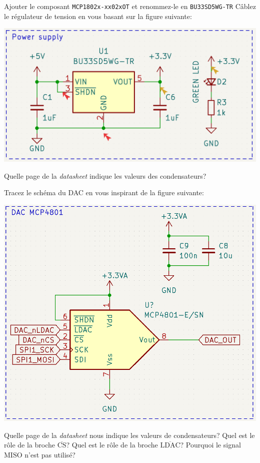 \documentclass[12pt,%
addpoints,%
]{exam}
\begin{document}
\begin{questions}
	\question Ajouter le composant \texttt{MCP1802x-xx02xOT} et renommez-le en \texttt{BU33SD5WG-TR}
	\question Câblez le régulateur de tension en vous basant sur la figure suivante:
	\begin{center}
        \includegraphics[scale=0.3]{figures/kicad08.png}
    \end{center}
	\question Quelle page de la \emph{datasheet} indique les valeurs des condensateurs?

	\question Tracez le schéma du DAC en vous inspirant de la figure suivante:
	\begin{center}
        \includegraphics[scale=0.4]{figures/kicad09.png}
    \end{center}
	\question Quelle page de la \emph{datasheet} nous indique les valeurs de condensateurs?
	\question Quel est le rôle de la broche $\overline{\textrm{CS}}$?
	\question Quel est le rôle de la broche $\overline{\textrm{LDAC}}$?
	\question Pourquoi le signal $\textrm{MISO}$ n'est pas utilisé?


\end{questions}
\end{document}
